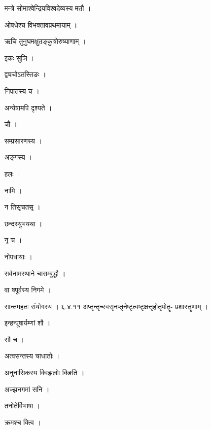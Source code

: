 \documentclass[10pt, openany]{book}
\begin{document}
\noindent मन्त्रे सोमाश्वेन्द्रियविश्वदेव्यस्य मतौ ।

\noindent ओषधेश्च विभक्तावप्रथमायाम् ।

\noindent ऋचि तुनुघमक्षुतङ्कुत्रोरुष्याणाम् ।

\noindent इकः सुञि ।

\noindent द्व्यचोऽतस्तिङः ।

\noindent निपातस्य च ।

\noindent अन्येषामपि दृश्यते ।

\noindent चौ ।

\noindent सम्प्रसारणस्य ।

\noindent अङ्गस्य ।

\noindent हलः ।

\noindent नामि ।

\noindent न तिसृचतसृ ।

\noindent छन्दस्युभयथा ।

\noindent नृ च ।

\noindent नोपधायाः ।

\noindent सर्वनामस्थाने चासम्बुद्धौ ।

\noindent वा षपूर्वस्य निगमे ।

\noindent सान्तमहतः संयोगस्य । ६.४.११ अप्तृन्तृच्स्वसृनप्तृनेष्टृत्वष्टृक्षत्तृहोतृपोतॄ- प्रशास्तॄणाम् ।

\noindent इन्हन्पूषार्यम्णां शौ ।

\noindent सौ च ।

\noindent अत्वसन्तस्य चाधातोः ।

\noindent अनुनासिकस्य क्विझलोः क्ङिति ।

\noindent अज्झनगमां सनि ।

\noindent तनोतेर्विभाषा ।

\noindent क्रमश्च क्त्वि ।
\end{document}
